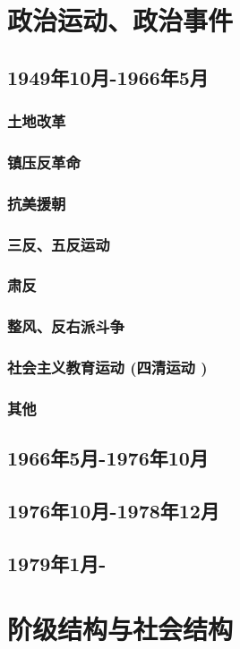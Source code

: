 \documentclass[UTF8]{../RepresentationUniverse}
\begin{document}
\section{政治运动、政治事件}
\subsection{1949年10月-1966年5月}
    \subsubsection{土地改革}
    \subsubsection{镇压反革命}
    \subsubsection{抗美援朝}
    \subsubsection{三反、五反运动}
    \subsubsection{肃反}
    \subsubsection{整风、反右派斗争}
    \subsubsection{社会主义教育运动 (四清运动 )}
    \subsubsection{其他}
\subsection{1966年5月-1976年10月}
\subsection{1976年10月-1978年12月}
\subsection{1979年1月-}




\section{阶级结构与社会结构}
\end{document}
